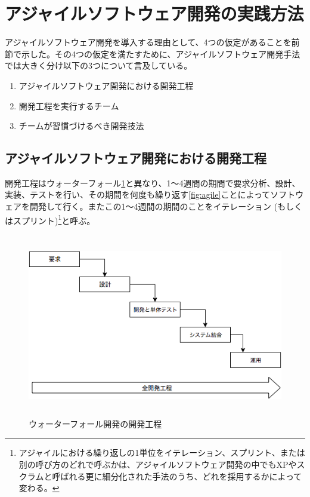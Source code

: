 \section{アジャイルソフトウェア開発の実践方法}

アジャイルソフトウェア開発を導入する理由として、4つの仮定があることを前節で示した。その4つの仮定を満たすために、アジャイルソフトウェア開発手法では大きく分け以下の3つについて言及している。

\begin{enumerate}
  \item アジャイルソフトウェア開発における開発工程
  \item 開発工程を実行するチーム
  \item チームが習慣づけるべき開発技法
\end{enumerate}

\subsection{アジャイルソフトウェア開発における開発工程}

開発工程はウォーターフォール\ref{fig:waterfall}と異なり、1〜4週間の期間で要求分析、設計、実装、テストを行い、その期間を何度も繰り返す\ref{fig:agile}ことによってソフトウェアを開発して行く。またこの1〜4週間の期間のことをイテレーション (もしくはスプリント)\footnote{アジャイルにおける繰り返しの1単位をイテレーション、スプリント、または別の呼び方のどれで呼ぶかは、アジャイルソフトウェア開発の中でもXPやスクラムと呼ばれる更に細分化された手法のうち、どれを採用するかによって変わる。}と呼ぶ。

\begin{figure}[H]
\centering
\includegraphics[height=8cm]{./assets/images/waterfall.png}
\caption{ウォーターフォール開発の開発工程}
\label{fig:waterfall}
\end{figure}


